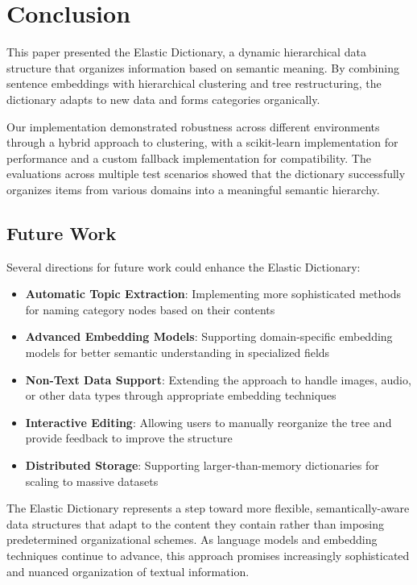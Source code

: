 \documentclass[conference]{IEEEtran}
\begin{document}
\section{Conclusion}

This paper presented the Elastic Dictionary, a dynamic hierarchical data structure that organizes information based on semantic meaning. By combining sentence embeddings with hierarchical clustering and tree restructuring, the dictionary adapts to new data and forms categories organically.

Our implementation demonstrated robustness across different environments through a hybrid approach to clustering, with a scikit-learn implementation for performance and a custom fallback implementation for compatibility. The evaluations across multiple test scenarios showed that the dictionary successfully organizes items from various domains into a meaningful semantic hierarchy.

\subsection{Future Work}

Several directions for future work could enhance the Elastic Dictionary:

\begin{itemize}
    \item \textbf{Automatic Topic Extraction}: Implementing more sophisticated methods for naming category nodes based on their contents
    \item \textbf{Advanced Embedding Models}: Supporting domain-specific embedding models for better semantic understanding in specialized fields
    \item \textbf{Non-Text Data Support}: Extending the approach to handle images, audio, or other data types through appropriate embedding techniques
    \item \textbf{Interactive Editing}: Allowing users to manually reorganize the tree and provide feedback to improve the structure
    \item \textbf{Distributed Storage}: Supporting larger-than-memory dictionaries for scaling to massive datasets
\end{itemize}

The Elastic Dictionary represents a step toward more flexible, semantically-aware data structures that adapt to the content they contain rather than imposing predetermined organizational schemes. As language models and embedding techniques continue to advance, this approach promises increasingly sophisticated and nuanced organization of textual information.
\end{document}
